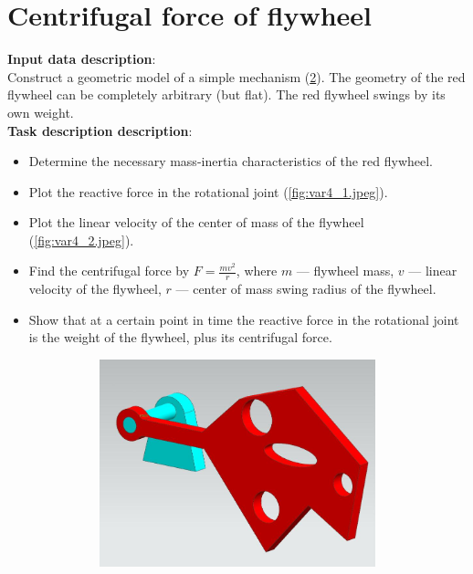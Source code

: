 \documentclass[12pt]{article}
\newcommand\ttask[3] 
 {
	\section*{#1}
	\textbf{Input data description}: \\ #2 \  \\
	\textbf{Task description description}: #3
	\newpage
 }
\begin{document}
\ttask{Centrifugal force of flywheel}{
	Construct a geometric model of a simple mechanism (\cref{fig:var4_0.jpeg}). The geometry of the red flywheel can be completely arbitrary (but flat). The red flywheel swings by its own weight.
}{
	\begin{itemize}
		\item Determine the necessary mass-inertia characteristics of the red flywheel.
		\item Plot the reactive force in the rotational joint (\cref{fig:var4_1.jpeg}).
		\item Plot the linear velocity of the center of mass of the flywheel (\cref{fig:var4_2.jpeg}).
		\item Find the centrifugal force by $F= \frac{m v^2}{r}$, where $m$ --- flywheel mass, $v$ --- linear velocity of the flywheel, $r$ --- center of mass swing radius of the flywheel.
		\item Show that at a certain point in time the reactive force in the rotational joint is the weight of the flywheel, plus its centrifugal force.
	\end{itemize}

	\begin{figure}[H]
		\begin{subfigure}{0.5\textwidth}
			\centering\includegraphics[height=6cm,width=1\textwidth,keepaspectratio]{var4_0.jpeg}
			\caption{}
			\label{fig:var4_0.jpeg}
		\end{subfigure}


\end{figure}}
\end{document}
